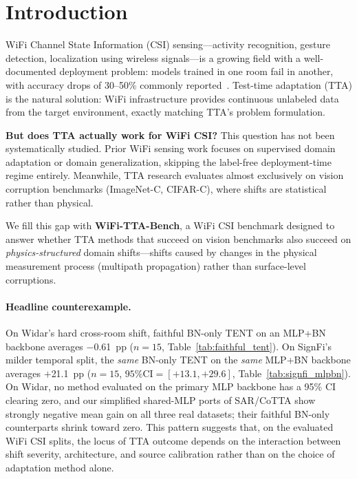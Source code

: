 \section{Introduction}

WiFi Channel State Information (CSI) sensing---activity recognition, gesture detection, localization using wireless signals---is a growing field with a well-documented deployment problem: models trained in one room fail in another, with accuracy drops of 30--50\% commonly reported~\cite{yousefi2017uthar}. Test-time adaptation (TTA) is the natural solution: WiFi infrastructure provides continuous unlabeled data from the target environment, exactly matching TTA's problem formulation.

\textbf{But does TTA actually work for WiFi CSI?} This question has not been systematically studied. Prior WiFi sensing work focuses on supervised domain adaptation or domain generalization, skipping the label-free deployment-time regime entirely. Meanwhile, TTA research evaluates almost exclusively on vision corruption benchmarks (ImageNet-C, CIFAR-C), where shifts are statistical rather than physical.

We fill this gap with \textbf{WiFi-TTA-Bench}, a WiFi CSI benchmark designed to answer whether TTA methods that succeed on vision benchmarks also succeed on \emph{physics-structured} domain shifts---shifts caused by changes in the physical measurement process (multipath propagation) rather than surface-level corruptions.

\paragraph{Headline counterexample.} On Widar's hard cross-room shift, faithful BN-only TENT on an MLP+BN backbone averages $-$0.61~pp ($n{=}15$, Table~\ref{tab:faithful_tent}). On SignFi's milder temporal split, the \emph{same} BN-only TENT on the \emph{same} MLP+BN backbone averages $+$21.1~pp ($n{=}15$, $95\%\text{CI}=[+13.1,+29.6]$, Table~\ref{tab:signfi_mlpbn}). On Widar, no method evaluated on the primary MLP backbone has a 95\% CI clearing zero, and our simplified shared-MLP ports of SAR/CoTTA show strongly negative mean gain on all three real datasets; their faithful BN-only counterparts shrink toward zero. This pattern suggests that, on the evaluated WiFi CSI splits, the locus of TTA outcome depends on the interaction between shift severity, architecture, and source calibration rather than on the choice of adaptation method alone.

